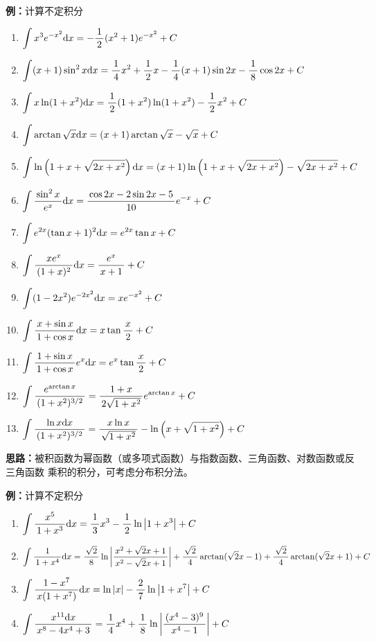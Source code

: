 {\bf 例：}计算不定积分
\begin{enumerate}[(1)]
  \setlength{\itemindent}{1cm}
  \item $\dint x^3e^{-x^2}\d x=-\df12(x^2+1)e^{-x^2}+C$
  \item $\dint (x+1)\sin^2x\d x=\df14x^2+\df12x-\df14(x+1)\sin 2x-
  \df18\cos2x+C$
  \item $\dint x\ln(1+x^2)\d x=\df12(1+x^2)\ln(1+x^2)-\df12x^2+C$
  \item $\dint\arctan\sqrt x\d x=(x+1)\arctan\sqrt x-\sqrt x+C$
  \item $\dint\ln\left(1+x+\sqrt{2x+x^2}\right)\d
  x=(x+1)\ln\left(1+x+\sqrt{2x+x^2}\right)-\sqrt{2x+x^2}+C$
  \item $\dint\df{\sin^2x}{e^x}\d x=\df{\cos2x-2\sin2x-5}{10}e^{-x}+C$
  \item $\dint e^{2x}(\tan x+1)^2\d x=e^{2x}\tan x+C$
  \item $\dint\df{xe^x}{(1+x)^2}\d x=\df{e^x}{x+1}+C$
  \item $\dint(1-2x^2)e^{-2x^2}\d x=xe^{-x^2}+C$
  \item $\dint\df{x+\sin x}{1+\cos x}\d x=x\tan\df x2+C$
  \item $\dint\df{1+\sin x}{1+\cos x}e^x\d x=e^x\tan\df x2+C$
  \item $\dint\df{e^{\arctan x}}{(1+x^2)^{3/2}}=\df{1+x}{2\sqrt{1+x^2}}
  e^{\arctan x}+C$
  \item $\dint\df{\ln x\d x}{(1+x^2)^{3/2}}=\df{x\ln x}{\sqrt{1+x^2}}
  -\ln\left(x+\sqrt{1+x^2}\right)+C$
\end{enumerate}

\begin{shaded}
{\bf 思路：}被积函数为幂函数（或多项式函数）与指数函数、三角函数、对数函数或反三角函数
乘积的积分，可考虑分布积分法。
\end{shaded}

{\bf 例：}计算不定积分
\begin{enumerate}[(1)]
  \setlength{\itemindent}{1cm}
  \item $\dint\df{x^5}{1+x^3}\d x=\df13x^3-\df12\ln\left|1+x^3\right|+C$
  \item $\dint\df1{1+x^4}\d x=\df{\sqrt 2}8\ln\left|
  \df{x^2+\sqrt2x+1}{x^2-\sqrt2x+1}\right|+\df{\sqrt 2}4\arctan(\sqrt2x-1)
  +\df{\sqrt2}4\arctan(\sqrt2x+1)+C$
  \item $\dint\df{1-x^7}{x(1+x^7)}\d x=\ln|x|-\df27\ln\left|1+x^7\right|+C$
  \item $\dint\df{x^{11}\d x}{x^8-4x^4+3}=\df14x^4+\df18
  \ln\left|\df{(x^4-3)^9}{x^4-1}\right|+C$
\end{enumerate}

